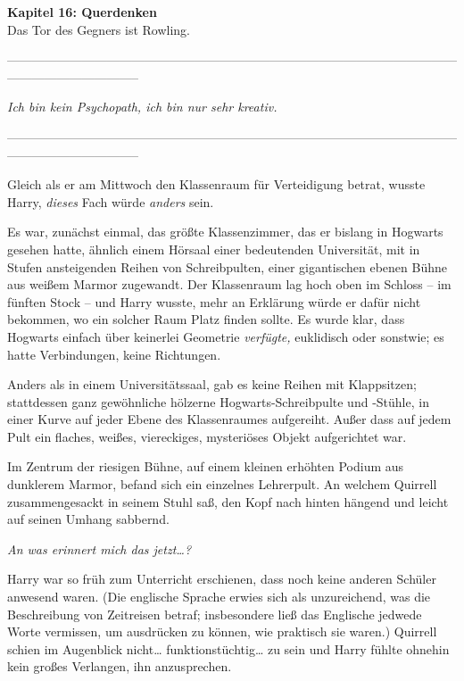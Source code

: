 

\hypertarget{querdenken}{%

\textbf{Kapitel 16: Querdenken}\\

Das Tor des Gegners ist Rowling.

--------------------------------------------------------------------------------------------------------------------------------------------

\emph{Ich bin kein Psychopath, ich bin nur sehr kreativ.}

--------------------------------------------------------------------------------------------------------------------------------------------

Gleich als er am Mittwoch den Klassenraum für Verteidigung betrat, wusste Harry, \emph{dieses} Fach würde \emph{anders} sein.

Es war, zunächst einmal, das größte Klassenzimmer, das er bislang in Hogwarts gesehen hatte, ähnlich einem Hörsaal einer bedeutenden Universität, mit in Stufen ansteigenden Reihen von Schreibpulten, einer gigantischen ebenen Bühne aus weißem Marmor zugewandt. Der Klassenraum lag hoch oben im Schloss -- im fünften Stock -- und Harry wusste, mehr an Erklärung würde er dafür nicht bekommen, wo ein solcher Raum Platz finden sollte. Es wurde klar, dass Hogwarts einfach über keinerlei Geometrie \emph{verfügte,} euklidisch oder sonstwie; es hatte Verbindungen, keine Richtungen.

Anders als in einem Universitätssaal, gab es keine Reihen mit Klappsitzen; stattdessen ganz gewöhnliche hölzerne Hogwarts-Schreibpulte und -Stühle, in einer Kurve auf jeder Ebene des Klassenraumes aufgereiht. Außer dass auf jedem Pult ein flaches, weißes, viereckiges, mysteriöses Objekt aufgerichtet war.

Im Zentrum der riesigen Bühne, auf einem kleinen erhöhten Podium aus dunklerem Marmor, befand sich ein einzelnes Lehrerpult. An welchem Quirrell zusammengesackt in seinem Stuhl saß, den Kopf nach hinten hängend und leicht auf seinen Umhang sabbernd.

\emph{An was erinnert mich das jetzt…?}

Harry war so früh zum Unterricht erschienen, dass noch keine anderen Schüler anwesend waren. (Die englische Sprache erwies sich als unzureichend, was die Beschreibung von Zeitreisen betraf; insbesondere ließ das Englische jedwede Worte vermissen, um ausdrücken zu können, wie praktisch sie waren.) Quirrell schien im Augenblick nicht… funktionstüchtig… zu sein und Harry fühlte ohnehin kein großes Verlangen, ihn anzusprechen.

}
